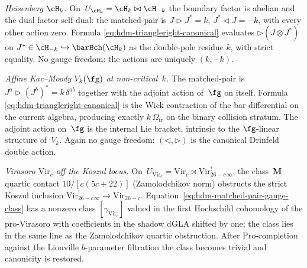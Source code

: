 \begin{example}
\label{ex:hdm-matched-pair-canonicity-flagships}
\emph{Heisenberg $\cH_k$.} On~$U_{\cH_k}=\cH_k\bowtie\cH_{-k}$ the
boundary factor is abelian and the dual factor self-dual: the
matched-pair is
$J\triangleright J^* = k$, $J^*\triangleleft J = -k$, with every
other action zero. Formula
\eqref{eq:hdm-triangleright-canonical} evaluates
$\triangleright(J\otimes J^*)$ on
$J^*\in\cH_{-k}\hookrightarrow\barBch(\cH_k)$
as the double-pole residue $k$, with strict equality. No gauge
freedom: the actions are uniquely $(k,-k)$.

\emph{Affine Kac--Moody $V_k(\fg)$ at non-critical~$k$.} The
matched-pair is
$J^a\triangleright (J^b)^* = k\,\delta^{ab}$ together with the
adjoint action of~$\fg$ on itself. Formula
\eqref{eq:hdm-triangleright-canonical} is the Wick contraction of
the bar differential on the current algebra, producing exactly
$k\,\Omega_{\mathrm{tr}}$ on the binary collision stratum. The
adjoint action on~$\fg$ is the internal Lie bracket, intrinsic to
the $\fg$-linear structure of~$V_k$. Again no gauge freedom:
$(\triangleleft,\triangleright)$ is the canonical Drinfeld double
action.

\emph{Virasoro $\mathrm{Vir}_c$ off the Koszul locus.}
On~$U_{\mathrm{Vir}_c}=\mathrm{Vir}_c\bowtie\mathrm{Vir}_{26-c}^!_\infty$,
the class~$\mathbf M$ quartic contact
$10/[c(5c+22)]$ (Zamolodchikov norm) obstructs the strict Koszul
inclusion $\mathrm{Vir}_{26-c}^!_\infty\to\mathrm{Vir}_{26-c}$.
Equation~\eqref{eq:hdm-matched-pair-gauge-class} has a nonzero class
$[\gamma_{\mathrm{Vir}_c}]$ valued in the first Hochschild cohomology
of the pro-Virasoro with coefficients in the shadow dGLA shifted by
one; the class lies in the same line as the Zamolodchikov quartic
obstruction. After $\mathrm{Pro}$-completion against the Liouville
$b$-parameter filtration the class becomes trivial and canonicity is
restored.
\end{example}

